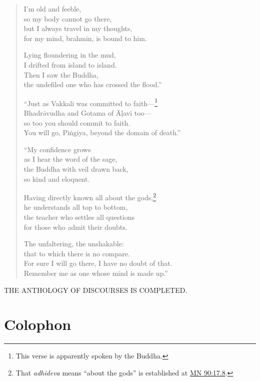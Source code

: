 \documentclass[12pt,openany]{book}%
\newcommand*{\scendbook}[1]{\bigskip\begin{Center}\uppercase{#1}\end{Center}\addvspace{1em}}
\let\oldbackmatter\backmatter
\renewcommand{\backmatter}{%
\chapterfont{\setstretch{.85}\normalfont\centering}%
\sectionfont{\setstretch{.85}\normalfont\BalancedRagged}%
\pagestyle{plainer}%
\oldbackmatter}
\begin{document}
\begin{verse}
I’m old and feeble, \\
so my body cannot go there, \\
but I always travel in my thoughts, \\
for my mind, brahmin, is bound to him. 

Lying floundering in the mud, \\
I drifted from island to island. \\
Then I saw the Buddha, \\
the undefiled one who has crossed the flood.” 

“Just as Vakkali was committed to faith—\footnote{This verse is apparently spoken by the Buddha. } \\
\textsanskrit{Bhadrāvudha} and Gotama of \textsanskrit{Āḷavī} too—\\
so too you should commit to faith. \\
You will go, \textsanskrit{Piṅgiya}, beyond the domain of death.” 

“My confidence grows \\
as I hear the word of the sage, \\
the Buddha with veil drawn back, \\
so kind and eloquent. 

Having directly known all about the gods,\footnote{That \textit{adhideva} means “about the gods” is established at \href{https://suttacentral.net/mn90/en/sujato\#17.8}{MN 90:17.8}. } \\
he understands all top to bottom, \\
the teacher who settles all questions \\
for those who admit their doubts. 

The unfaltering, the unshakable: \\
that to which there is no compare. \\
For sure I will go there, I have no doubt of that. \\
Remember me as one whose mind is made up.” 

%
\end{verse}

\scendbook{The Anthology of Discourses is completed. }

%
\backmatter%
%
\chapter*{Colophon}
\end{document}
